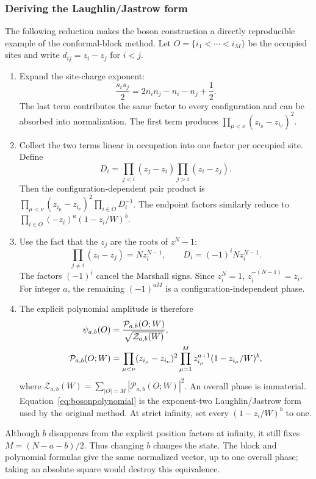 \subsubsection{Deriving the Laughlin/Jastrow form}
The following reduction makes the boson construction a directly
reproducible example of the conformal-block method. Let
$O=\{i_1<\cdots<i_M\}$ be the occupied sites and write $d_{ij}=z_i-z_j$
for $i<j$.
\begin{enumerate}
\item Expand the site-charge exponent:
\begin{equation}
 \frac{s_i s_j}{2}=2n_i n_j-n_i-n_j+\frac12.
\end{equation}
The last term contributes the same factor to every configuration and
can be absorbed into normalization. The first term produces
$\prod_{\mu<\nu}(z_{i_\mu}-z_{i_\nu})^2$.
\item Collect the two terms linear in occupation into one factor per
occupied site. Define
\begin{equation}
 D_i=\prod_{j<i}(z_j-z_i)\prod_{j>i}(z_i-z_j).
\end{equation}
Then the configuration-dependent pair product is
$\prod_{\mu<\nu}(z_{i_\mu}-z_{i_\nu})^2\prod_{i\in O}D_i^{-1}$.
The endpoint factors similarly reduce to
$\prod_{i\in O}(-z_i)^a(1-z_i/W)^b$.
\item Use the fact that the $z_j$ are the roots of $z^N-1$:
\begin{equation}
 \prod_{j\ne i}(z_i-z_j)=Nz_i^{N-1},\qquad
 D_i=(-1)^iNz_i^{N-1}.
\end{equation}
The factors $(-1)^i$ cancel the Marshall signs. Since $z_i^N=1$,
$z_i^{-(N-1)}=z_i$. For integer $a$, the remaining
$(-1)^{aM}$ is a configuration-independent phase.
\item The explicit polynomial amplitude is therefore
\begin{align}
 \psi_{a,b}(O)&=\frac{\mathcal P_{a,b}(O;W)}{\sqrt{\mathcal Z_{a,b}(W)}},
 \notag\\
 \mathcal P_{a,b}(O;W)&=
 \prod_{\mu<\nu}(z_{i_\mu}-z_{i_\nu})^2
 \prod_{\mu=1}^{M}z_{i_\mu}^{a+1}(1-z_{i_\mu}/W)^b ,
 \label{eq:bosonpolynomial}
\end{align}
where $\mathcal Z_{a,b}(W)=\sum_{|O|=M}|\mathcal P_{a,b}(O;W)|^2$.
An overall phase is immaterial. Equation~\eqref{eq:bosonpolynomial}
is the exponent-two Laughlin/Jastrow form used by the original method.
At strict infinity, set every $(1-z_i/W)^b$ to one.
\end{enumerate}
Although $b$ disappears from the explicit position factors at infinity,
it still fixes $M=(N-a-b)/2$. Thus changing $b$ changes the state.
The block and polynomial formulas give the same normalized vector,
up to one overall phase; taking an absolute square would destroy this
equivalence.


